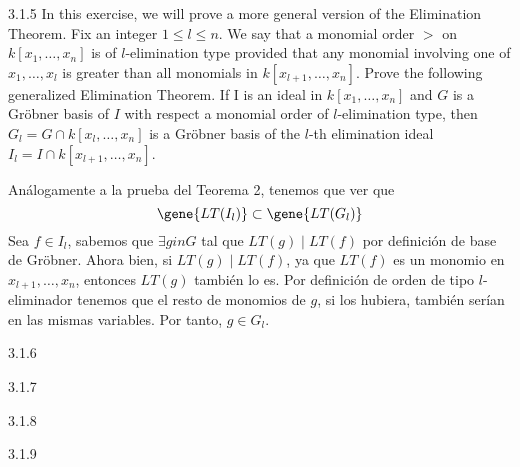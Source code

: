 \documentclass[twoside]{article}
\begin{document}
\begin{ejercicio}{3.1.5}
In this exercise, we will prove a more general version of the Elimination Theorem. Fix an integer $1\leq l \leq n$. We say that a monomial order $>$ on $k[x_1,\dotsc, x_n]$ is of $l$-elimination type provided that any monomial involving one of $x_1,\dotsc, x_l$ is greater than all monomials in $k[x_{l+1}, \dotsc, x_n]$. Prove the following generalized Elimination Theorem. If I is an ideal in $k[x_1,\dotsc, x_n]$ and $G$ is a  Gröbner basis of $I$ with respect a monomial order of $l$-elimination type, then $G_l = G\cap k[x_l,\dotsc, x_n]$ is a Gröbner basis of the $l$-th elimination ideal $I_l = I\cap k[x_{l+1},\dotsc, x_n]$.
\end{ejercicio}
\begin{solucion}
Análogamente a la prueba del Teorema 2, tenemos que ver que $$\gene{LT(I_l)}\subset \gene{LT(G_l)}$$
Sea $f\in I_l$, sabemos que $\exists g in G$ tal que $LT(g)\mid LT(f)$ por definición de base de Gröbner. Ahora bien, si $LT(g)\mid LT(f)$, ya que $LT(f)$ es un monomio en $x_{l+1},\dotsc,x_n$, entonces $LT(g)$ también lo es. Por definición de  orden de tipo $l$-eliminador tenemos que el resto de monomios de $g$, si los hubiera, también serían en las mismas variables. Por tanto, $g\in G_l$.
\end{solucion}


\newpage

\begin{ejercicio}{3.1.6}

\end{ejercicio}
\begin{solucion}
\begin{enumerate}[a.]
\end{enumerate}
\end{solucion}


\newpage

\begin{ejercicio}{3.1.7}

\end{ejercicio}
\begin{solucion}
\begin{enumerate}[a.]
\end{enumerate}
\end{solucion}


\newpage

\begin{ejercicio}{3.1.8}

\end{ejercicio}
\begin{solucion}
\begin{enumerate}[a.]
\end{enumerate}
\end{solucion}


\newpage

\begin{ejercicio}{3.1.9}

\end{ejercicio}
\begin{solucion}
\begin{enumerate}[a.]
\end{enumerate}
\end{solucion}
\end{document}
